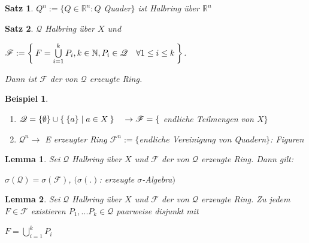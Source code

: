 \documentclass[11pt]{memoir}
\theoremstyle{changebreak}
\newtheorem{Beispiel}{Beispiel}[chapter]
\newtheorem{Lemma}{Lemma}[chapter]
\newtheorem{Satz}{Satz}[chapter]
\begin{document}
\begin{Satz}
$Q^n := \{Q \in \mathbb R^n: Q $ Quader$\}$ ist Halbring über $\mathbb R^n$
\end{Satz}

\begin{Satz}
$\mathscr Q$ Halbring über $X$ und 
\begin{center}
	$\mathscr F := \Set{F = \bigcup\limits_{i=1}^k P_i, k \in \mathbb N, P_i \in \mathscr Q \quad \forall 1 \leq i \leq k}$. 
\end{center}	
Dann ist $\mathscr F$ der von $\mathscr Q$ erzeugte Ring.
\end{Satz}

\begin{Beispiel}
\begin{enumerate}
	\item $\mathscr Q = \{\emptyset \} \cup \Set{\{a\}| a \in X} \quad \rightarrow \mathscr F = \{$ endliche Teilmengen von $X\}$
	\item $\mathscr Q^n \rightarrow$ E erzeugter Ring $\mathscr F^n:= \{$endliche Vereinigung von Quadern$\}$: Figuren
\end{enumerate}
\end{Beispiel}

\begin{Lemma}
Sei $\mathscr Q$ Halbring über $X$ und $\mathscr F$ der von $\mathscr Q$ erzeugte Ring. Dann gilt: 
\begin{center}
	$\sigma(\mathscr Q) = \sigma(\mathscr F)$, \quad $(\sigma(.)$: erzeugte $\sigma$-Algebra$)$
\end{center}
\end{Lemma}

\begin{Lemma}
Sei $\mathscr Q$ Halbring über $X$ und $\mathscr F$ der von $\mathscr Q$ erzeugte Ring. Zu jedem $F \in \mathscr F$ existieren $P_1, ... P_k \in \mathscr Q$ \emph{paarweise disjunkt} mit 
\begin{center}
	$F = \bigcup\limits_{i=1}^k P_i$
\end{center}
\end{Lemma}
\end{document}
